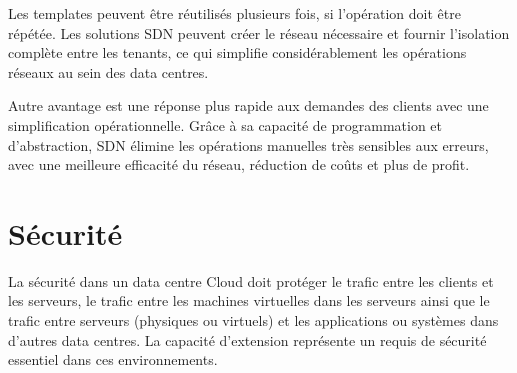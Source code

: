 Les templates peuvent être réutilisés plusieurs fois, si l'opération doit être répétée. Les solutions SDN peuvent créer le réseau nécessaire et fournir l'isolation complète entre les tenants, ce qui simplifie considérablement les opérations réseaux au sein des data centres. 

Autre avantage est une réponse plus rapide aux demandes des clients avec une simplification opérationnelle. Grâce à sa capacité de programmation et d'abstraction, SDN élimine les opérations manuelles très sensibles aux erreurs, avec une meilleure efficacité du réseau, réduction de coûts et plus de profit.

\section{Sécurité}

La sécurité dans un data centre Cloud doit protéger le trafic entre les clients et les serveurs, le trafic entre les machines virtuelles dans les serveurs ainsi que le trafic entre serveurs (physiques ou virtuels) et les applications ou systèmes dans d'autres data centres. La capacité d'extension représente un requis de sécurité essentiel dans ces environnements. 




